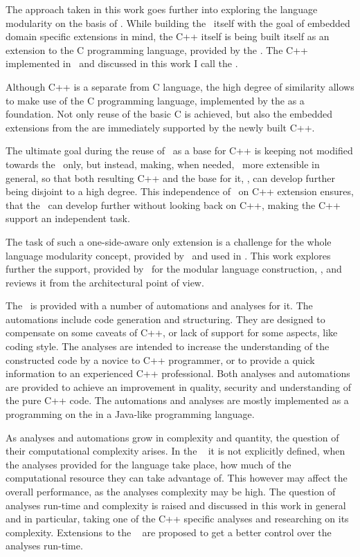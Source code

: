 The approach taken in this work goes further into exploring the language modularity on the basis of \jbmps. While building 
the \cpppl\ itself  with the goal of embedded domain specific extensions in mind, the C++ itself is being built itself as 
an extension to the C programming language, provided by the . The C++ implemented in \jbmps\ and discussed in this 
work I call the \pcpp.

Although C++ is a separate from C language, the high degree of similarity allows to make use of the C programming language,
implemented by the  as a foundation. Not only reuse of the basic C is achieved, but also the embedded extensions from
the  are immediately supported by the newly built C++.

The ultimate goal during the reuse of \mbdr\ as a base for C++ is keeping 
not modified towards the \cpppl\ only, but instead, making, when needed, \mbeddr\  more extensible in general, 
so that both resulting C++ and the base for it, \mbdr,  can develop further being disjoint to a high degree.
This independence of \mbdr\ on C++ extension ensures, that the \mbdp\ can develop further without looking back 
on C++, making the C++ support an independent task.

The task of such a one-side-aware only extension is a challenge for the whole language modularity concept, 
provided by \jbmps\ and used in \mbdr. This work explores further the support, provided by \jbmps\ for the modular 
language construction, \cite{2012_ratiu_modular_dsls_and_analyses}, and reviews it from the architectural point of view.

The \cpppl\ is provided with a number of automations and analyses for it. The automations include code 
generation and structuring. They are designed to compensate on some caveats of C++, or lack of support for 
some aspects, like coding style. The analyses are intended to increase the understanding of the constructed
code by a novice to C++ programmer, or to provide a quick information to an experienced C++ professional. 
Both analyses and automations are provided to achieve an improvement in quality, security and understanding of 
the pure C++ code. The automations and analyses are mostly implemented as a programming on the  
in a Java-like programming language.

As analyses and automations grow in complexity and quantity, the question of their computational complexity arises.
In the \jbmps\  it is not explicitly defined, when the analyses provided for the language take place, 
how much of the computational resource they can take advantage of. This however may affect the overall  performance, 
as the analyses complexity may be high. The question of analyses run-time and complexity is raised and discussed in 
this work in general and in particular, taking one of the C++ specific analyses and researching on its complexity.
Extensions to the \jbmps\  are proposed to get a better control over the analyses run-time.

